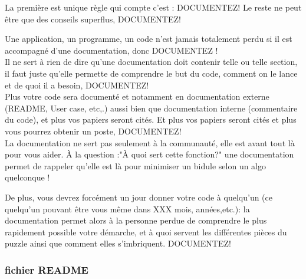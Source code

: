 La première est unique règle qui compte c'est : DOCUMENTEZ!
Le reste ne peut être que des conseils superflus, DOCUMENTEZ! 

Une application, un programme, un code n'est jamais totalement perdu si 
il est accompagné d'une documentation, donc DOCUMENTEZ !\\

Il ne sert à rien de dire qu'une documentation doit contenir telle ou telle section, il faut juste 
qu'elle permette de comprendre le but du code, comment on le lance et de quoi il a besoin, DOCUMENTEZ! \\

Plus votre code sera documenté et notamment en documentation externe (README, User case, etc,.) aussi 
bien que documentation interne (commentaire du code), et plus vos papiers seront cités. 
Et plus vos papiers seront cités et plus vous pourrez obtenir un poste, DOCUMENTEZ! \\

La documentation ne sert pas seulement à la communauté, elle est avant tout là pour vous aider. 
\`A la question :"\`A quoi sert cette fonction?" une documentation permet de rappeler qu'elle
 est là pour minimiser un bidule selon un algo quelconque ! 

De plus, vous devrez forcément un jour donner votre code \`a quelqu'un (ce quelqu'un
pouvant \^etre vous m\^eme dans XXX mois, années,etc.):
la documentation permet alors \`a la personne perdue de comprendre le plus rapidement possible 
votre démarche, et à quoi servent les différentes pièces du puzzle ainsi que comment elles 
s'imbriquent. DOCUMENTEZ!

\subsubsection*{fichier README }

